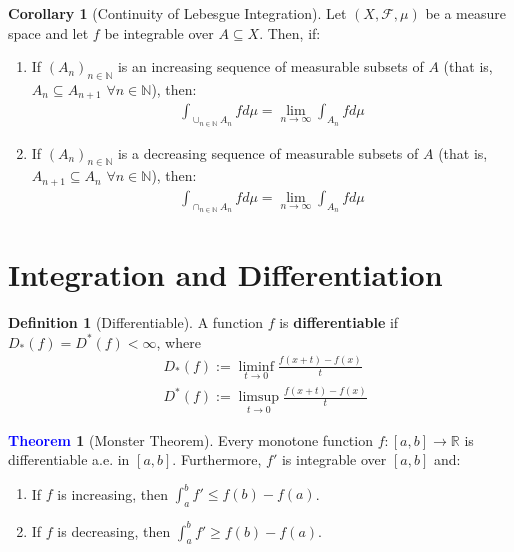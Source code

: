 \documentclass[reqno,11pt]{amsart}
\theoremstyle{definition}
\newcommand{\bb}[1]{\mathbb{#1}}
\newtheorem{theorem}{\textcolor{blue}{Theorem}}
\newtheorem{corollary}{Corollary}
\theoremstyle{definition}
\newtheorem{definition}{\textcolor{OliveGreen}{Definition}}
\theoremstyle{remark}
\begin{document}
\begin{corollary}[Continuity of Lebesgue Integration] 
Let $(X, \mathcal{F}, \mu)$ be a measure space and let $f$ be integrable over $A \subseteq X$. Then, if: 
\begin{enumerate}[noitemsep]
	\item If $(A_n)_{n \in \bb{N}}$ is an increasing sequence of measurable subsets of $A$ (that is, $A_n \subseteq  A_{n +1}$ $\forall n \in \bb{N}$), then: 
	\begin{align*}
		\int_{ \cup_{n \in \bb{N}} A_n} f d \mu  = \lim_{n \rightarrow \infty } \int_{A_n} f d \mu 
	\end{align*}
	\item If $(A_n)_{n \in \bb{N}}$ is a decreasing sequence of measurable subsets of $A$ (that is, $A_{n+1} \subseteq  A_{n}$ $\forall n \in \bb{N}$), then:
	\begin{align*}
		\int_{ \cap_{n \in \bb{N}} A_n} f d \mu  = \lim_{n \rightarrow \infty } \int_{A_n} f d \mu 
	\end{align*}
\end{enumerate}
\end{corollary}

\section{Integration and Differentiation}

\begin{definition}[Differentiable]
	A function $f$ is \textbf{differentiable} if $D_*(f) = D^*(f) < \infty$, where
	\begin{align*}
		& D_*(f) := \liminf_{t \rightarrow 0} \frac{f(x+t) - f(x)}{t} \\
		& D^*(f) := \limsup_{t \rightarrow 0} \frac{f(x+t) - f(x)}{t} 
	\end{align*}
\end{definition}


\begin{theorem}[Monster Theorem]
	Every monotone function $f: [a, b] \rightarrow \bb{R}$ is differentiable a.e. in $[a,b]$. Furthermore, $f'$ is integrable over $[a,b]$ and: 
\begin{enumerate}[noitemsep]
	\item If $f$ is increasing, then $\int_a^b f' \leq f(b) - f(a)$. 
	\item If $f$ is decreasing, then $\int_a^b f' \geq f(b) - f(a)$. 
\end{enumerate}
\end{theorem}
\end{document}
